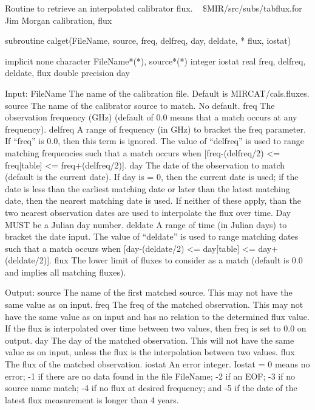 %
\noindent Routine to retrieve an interpolated calibrator flux.
\newline \ 
\newline {} \$MIR/src/subs/tabflux.for
\newline {} Jim Morgan
\newline {} calibration, flux
\par{\tenpoint
{\eightpoint\begintt
      subroutine calget(FileName, source, freq, delfreq, day, deldate,
     *  flux, iostat)

      implicit none
      character FileName*(*), source*(*)
      integer iostat
      real freq, delfreq, deldate, flux
      double precision day

 Input:
   FileName The name of the calibration file.  Default is
            MIRCAT/cals.fluxes.
   source   The name of the calibrator source to match.  No default.
   freq     The observation frequency (GHz) (default of 0.0 means
            that a match occurs at any frequency).
   delfreq  A range of frequency (in GHz) to bracket the freq
            parameter.  If ``freq'' is 0.0, then this term is ignored.
            The value of ``delfreq'' is used to range matching
            frequencies such that a match occurs when
            [freq-(delfreq/2) <= freq[table] <= freq+(delfreq/2)].
   day      The date of the observation to match (default is the
            current date).  If day is = 0, then the current date is
            used; if the date is less than the earliest matching date
            or later than the latest matching date, then the nearest
            matching date is used.  If neither of these apply, than the
            two nearest observation dates are used to interpolate the
            flux over time.  Day MUST be a Julian day number.
   deldate  A range of time (in Julian days) to bracket the date input.
            The value of ``deldate'' is used to range matching dates
            such that a match occurs when
            [day-(deldate/2) <= day[table] <= day+(deldate/2)].
   flux     The lower limit of fluxes to consider as a match
            (default is 0.0 and implies all matching fluxes).

 Output:
   source   The name of the first matched source.  This may not have
            the same value as on input.
   freq     The freq of the matched observation.  This may not
            have the same value as on input and has no relation to
            the determined flux value.  If the flux is interpolated
            over time between two values, then freq is set to 0.0 on
            output.
   day      The day of the matched observation.  This will not have
            the same value as on input, unless the flux is the
            interpolation between two values.
   flux     The flux of the matched observation.
   iostat   An error integer.  Iostat = 0 means no error;
            -1 if there are no data found in the file FileName;
            -2 if an EOF; -3 if no source name match; -4 if no flux at
            desired frequency; and -5 if the date of the latest flux
            measurement is longer than 4 years.
\endtt}
\par}
